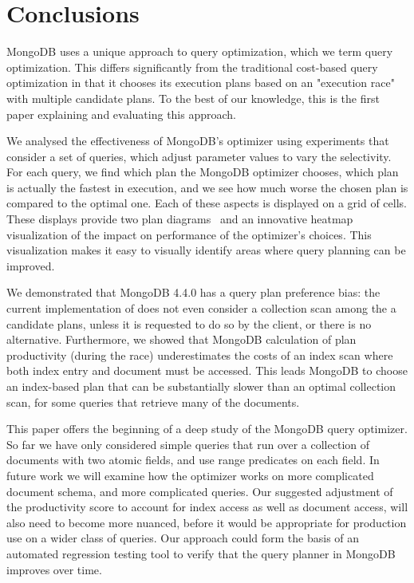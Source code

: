 \section{Conclusions}
\label{sec:conclusions}

MongoDB uses a unique approach to query optimization, which we term \approachName query optimization. This  differs significantly from the traditional cost-based query optimization in that it chooses its execution plans based on an "execution race" with multiple candidate plans. To the best of our knowledge, this is the first paper explaining and evaluating this approach.

We analysed the effectiveness of MongoDB's \approachName optimizer using experiments that consider a set of queries, which adjust parameter values to vary the selectivity. For each query, we find which plan the MongoDB optimizer chooses, which plan is actually the fastest in execution, and we see how much worse the chosen plan is compared to the optimal one. Each of these aspects is displayed on a grid of cells. These displays provide two plan diagrams~\cite{reddy2005analyzing} and an innovative heatmap visualization of the impact on performance of the optimizer's choices.  This visualization makes it easy to visually identify areas where query planning can be improved.

We demonstrated that MongoDB 4.4.0 has a query plan preference bias: the current implementation of \approachName does not even consider a collection scan among the a candidate plans, unless it is requested to do so by the client, or there is no alternative. Furthermore, we showed that MongoDB calculation of plan productivity (during the race) underestimates the costs of an index scan where both index entry and document must be accessed. This leads MongoDB to choose an index-based plan that can be substantially slower than an optimal collection scan, for some queries that retrieve many of the documents. 

This paper offers the beginning of a deep study of the MongoDB query optimizer. So far we have only considered simple queries that run over a collection of documents with two atomic fields, and use range predicates on each field. In future work we will examine how the optimizer works on more complicated document schema, and more complicated queries. Our suggested adjustment of the productivity score to account for index access as well as document access, will also need to become more nuanced, before it would be appropriate for production use on a wider class of queries. Our approach could form the basis of an automated regression testing tool to verify that the query planner in MongoDB improves over time.


